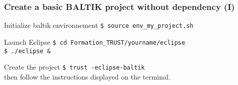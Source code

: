 \documentclass[10pt, hyperref={unicode=true,pdfusetitle, bookmarks=true,bookmarksnumbered=false,bookmarksopen=false, breaklinks=false,pdfborder={0 0 1},backref=true,colorlinks=true,linkcolor=darkblue,pageanchor, urlcolor=darkblue}]{beamer}
\begin{document}


\begin{frame}
\frametitle{Create a basic BALTIK project without dependency (I)}

\begin{block}{Initialize baltik environnement}
 \texttt{\$ source env\_my\_project.sh } \\
\end{block}

\begin{exampleblock}{Launch Eclipse}
\texttt{\$ cd Formation\_TRUST/yourname/eclipse } \\
\texttt{\$ ./eclipse \& }
\end{exampleblock}

\begin{exampleblock}{Create the project}
\texttt{\$ trust -eclipse-baltik} \\
then follow the instructions displayed on the terminal.
\end{exampleblock}

\end{frame}
\end{document}
